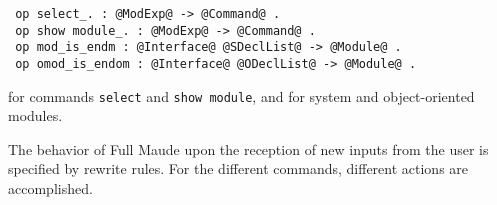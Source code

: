 \begin{small}
\begin{verbatim}
 op select_. : @ModExp@ -> @Command@ .
 op show module_. : @ModExp@ -> @Command@ .
 op mod_is_endm : @Interface@ @SDeclList@ -> @Module@ .
 op omod_is_endom : @Interface@ @ODeclList@ -> @Module@ .
\end{verbatim}
\end{small}
%
for commands
\texttt{select} and \texttt{show module}, and for system and object-oriented modules. 

The behavior of Full Maude upon the reception of new inputs from the user is specified by rewrite rules. For the different commands, different actions are accomplished. 
